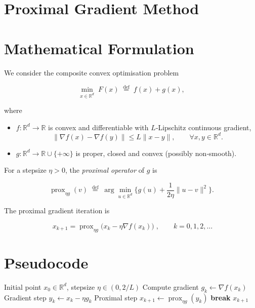 \documentclass{article}
\newcommand{\prox}{\operatorname{prox}}
\begin{document}
\section*{Proximal Gradient Method}

\section*{Mathematical Formulation}
We consider the composite convex optimisation problem  

\[
\min_{x\in\mathbb{R}^{d}} \; F(x)\;\stackrel{\text{def}}{=}\; f(x)+g(x),
\]

where  

\begin{itemize}
\item $f:\mathbb{R}^{d}\to\mathbb{R}$ is convex and differentiable with $L$‑Lipschitz continuous gradient,
      \[
      \|\nabla f(x)-\nabla f(y)\|\le L\|x-y\|,\qquad\forall x,y\in\mathbb{R}^{d}.
      \]
\item $g:\mathbb{R}^{d}\to\mathbb{R}\cup\{+\infty\}$ is proper, closed and convex (possibly non‑smooth).
\end{itemize}

For a stepsize $\eta>0$, the \emph{proximal operator} of $g$ is  

\[
\prox_{\eta g}(v)\;\stackrel{\text{def}}{=}\;\arg\min_{u\in\mathbb{R}^{d}}
\Big\{ g(u)+\frac{1}{2\eta}\|u-v\|^{2}\Big\}.
\]

The proximal gradient iteration is  

\[
\boxed{\;x_{k+1}= \prox_{\eta g}\!\big(x_{k}-\eta \nabla f(x_{k})\big)\;},
\qquad k=0,1,2,\dots
\]

\section*{Pseudocode}
\begin{algorithm}[H]
\caption{Proximal Gradient Method}
\begin{algorithmic}[1]
\REQUIRE Initial point $x_{0}\in\mathbb{R}^{d}$, stepsize $\eta\in(0,2/L)$
    \STATE Compute gradient $g_{k}\gets\nabla f(x_{k})$
    \STATE Gradient step $y_{k}\gets x_{k}-\eta g_{k}$
    \STATE Proximal step $x_{k+1}\gets\prox_{\eta g}(y_{k})$
        \STATE \textbf{break}
    \ENDIF
\ENDFOR
\RETURN $x_{k+1}$
\end{algorithmic}
\end{algorithm}
\end{document}
